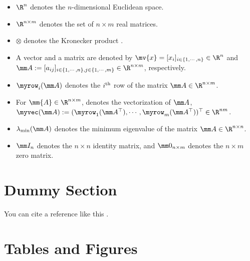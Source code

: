 \documentclass[conference]{IEEEtran}
\begin{document}
\begin{itemize}
    \item $\R^n$ denotes the $n$-dimensional Euclidean space.
    \item $\R^{n\times m}$ denotes the set of $n\times m$ real matrices.
    \item $\otimes$ denotes the Kronecker product \cite[Chap. 7 Def. 7.1.2]{Bernstein:2009aa}.
    \item A vector and a matrix are denoted by $\mv{x}=[x_i]_{i\in\{1,\cdots,n\}}\in\R^n$ and $
        \mm A
        := 
        [a_{ij}]
        _{
            i\in\{1,\cdots,n\},j\in\{1,\cdots ,m\}
        }\allowbreak\in\R^{n\times m}
        $, respectively.
    \item $\myrow_i(\mm A)$ denotes the $i\textsuperscript{th}$ row of the matrix $\mm A\in\R^{n\times m}$. 
    \item For $\mm{A}\in\R^{n\times m}$, denotes the vectorization of $\mm A$, $\myvec(\mm A):=(\myrow_1(\mm A^\top),\cdots,\myrow_m(\mm A^\top)  )^\top\in\R^{nm}$.
    \item $\lambda_{\min}(\mm A)$ denotes the minimum eigenvalue of the matrix $\mm A\in\R^{n\times n}$.
    \item $\mm I_n$ denotes the $n\times n$ identity matrix, and $\mm 0_{n\times m}$ denotes the $n\times m$ zero matrix.
\end{itemize}

\section{Dummy Section}

You can cite a reference like this \cite{Ryu:2024aa}.

\lipsum[1-3]

\section{Tables and Figures}
\end{document}
